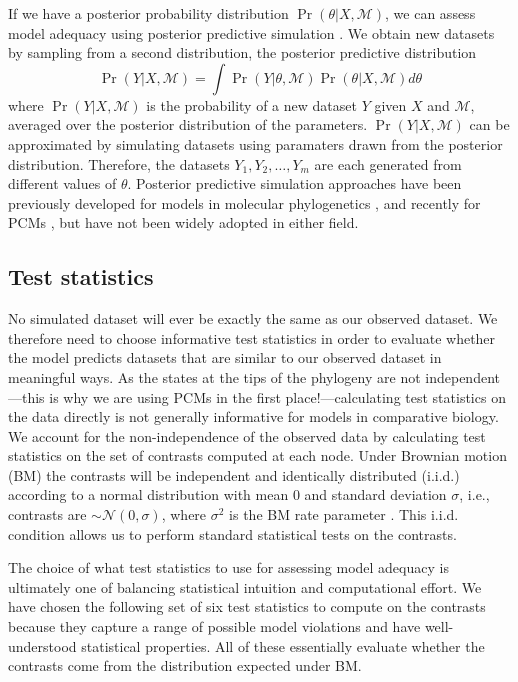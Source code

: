 If we have a posterior probability distribution $\Pr(\theta|X, \mathcal{M})$, we can assess model adequacy using posterior predictive simulation \citep{Rubin1984, Gelman1996}. We obtain new datasets by sampling from a second distribution, the posterior predictive distribution
\begin{equation}
\Pr(Y|X,\mathcal{M}) = \int \Pr(Y|\theta, \mathcal{M})\Pr(\theta |X,\mathcal{M})d\theta
\end{equation}
where $\Pr(Y|X,\mathcal{M})$ is the probability of a new dataset $Y$ given $X$ and $\mathcal{M}$, averaged over the posterior distribution of the parameters. $\Pr(Y|X,\mathcal{M})$ can be approximated by simulating datasets using paramaters drawn from the posterior distribution. Therefore, the datasets $Y_1, Y_2, \ldots, Y_m$ are each generated from different values of $\theta$. Posterior predictive simulation approaches have been previously developed for models in molecular phylogenetics \citep{Bollback2002, Reid2013, Lewis2013, Brown2013}, and recently for PCMs \citep{SlaterPennell}, but have not been widely adopted in either field.

\subsection{Test statistics}
No simulated dataset will ever be exactly the same as our observed dataset. We therefore need to choose informative test statistics in order to evaluate whether the model predicts datasets that are similar to our observed dataset in meaningful ways. As the states at the tips of the phylogeny are not independent---this is why we are using PCMs in the first place!---calculating test statistics on the data directly is not generally informative for models in comparative biology. We account for the non-independence of the observed data by calculating test statistics on the set of contrasts \citep[i.e., ``phylogenetically independent contrasts'';][]{Felsenstein1985} computed at each node. \citep[We refer readers to][for details on how contrasts are calculated.]{Felsenstein1985, Rohlf2001, Blomberg2012} Under Brownian motion (BM) the contrasts will be independent and identically distributed (i.i.d.) according to a normal distribution with mean 0 and standard deviation $\sigma$, i.e., contrasts are $\sim \mathcal{N}(\text{0}, \sigma)$, where $\sigma^2$ is the BM rate parameter \citep{Felsenstein1985}. This i.i.d. condition allows us to perform standard statistical tests on the contrasts. 

The choice of what test statistics to use for assessing model adequacy is ultimately one of balancing statistical intuition and computational effort. We have chosen the following set of six test statistics to compute on the contrasts because they capture a range of possible model violations and have well-understood statistical properties. All of these essentially evaluate whether the contrasts come from the distribution expected under BM. 

